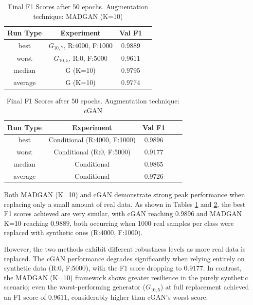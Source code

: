 \begin{table}[H]
	\vspace{-1.5em}
	\centering
	\begin{tabular}{|c|c|c|c|}
		\hline
		Run Type & Experiment & Val F1 \\ \hline
		best & \(G_{10, 7}\), R:4000, F:1000 & $0.9889$\\ \hline
		worst & \(G_{10, 5}\), R:0, F:5000 & $0.9611$\\ \hline
		median & G (K=10) & $0.9795$\\ \hline
		average & G (K=10) & $0.9774$
		\\ \hline
	\end{tabular}
    \caption{Final F1 Scores after 50 epochs. Augmentation technique: MADGAN (K=10)}
        \label{tab:res_replacement_mnist_ccgan_vs_madgan__madgan}
\end{table}
\begin{table}[H]
	\centering
	\vspace{-1.5em}
	\begin{tabular}{|c|c|c|c|c|}
		\hline
		Run Type & Experiment & Val F1 \\ \hline
		best & Conditional (R:4000, F:1000) & $0.9896$\\ \hline
		worst & Conditional (R:0, F:5000) & $0.9177$\\ \hline
		median & Conditional & $0.9865$\\ \hline
		average & Conditional & $0.9726$
		\\ \hline
	\end{tabular}
    \caption{Final F1 Scores after 50 epochs. Augmentation technique: cGAN}
        \label{tab:res_replacement_mnist_ccgan_vs_madgan__cgan}
\end{table}
Both MADGAN (K=10) and cGAN demonstrate strong peak performance when replacing only a small amount of real data. As shown in Tables \ref{tab:res_replacement_mnist_ccgan_vs_madgan__madgan} and \ref{tab:res_replacement_mnist_ccgan_vs_madgan__cgan}, the best F1 scores achieved are very similar, with cGAN reaching $0.9896$ and MADGAN K=10 reaching $0.9889$, both occurring when 1000 real samples per class were replaced with synthetic ones (R:4000, F:1000).

However, the two methods exhibit different robustness levels as more real data is replaced. The cGAN performance degrades significantly when relying entirely on synthetic data (R:0, F:5000), with the F1 score dropping to $0.9177$. In contrast, the MADGAN (K=10) framework shows greater resilience in the purely synthetic scenario; even the worst-performing generator (\(G_{10,5}\)) at full replacement achieved an F1 score of $0.9611$, considerably higher than cGAN's worst score.

